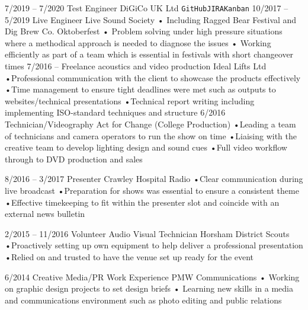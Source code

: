 \documentclass[9pt]{developercv} %
\begin{document}
\begin{entrylist}
	\entry
		{7/2019 -- 7/2020}
		{Test Engineer}
		{DiGiCo UK Ltd}
		{\texttt{GitHub}\slashsep\texttt{JIRA}\slashsep\texttt{Kanban}}
		\entry
		{10/2017 -- 5/2019}
		{Live Engineer}
		{Live Sound Society}
		{• Including Ragged Bear Festival and Dig Brew Co. Oktoberfest \newline• Problem solving under high pressure situations where a methodical approach is needed to diagnose the issues
\newline• Working efficiently as part of a team which is essential in festivals with short changeover times}
\entry
		{7/2016 -- }
		{Freelance acoustics and video production}
		{Ideal Lifts Ltd}
		{•Professional communication with the client to showcase the products effectively
\newline•Time management to ensure tight deadlines were met such as outputs to websites/technical presentations
\newline•Technical report writing including implementing ISO-standard techniques and structure}
\entry
		{6/2016}
		{Technician/Videography}
		{Act for Change  (College Production)}
		{•Leading a team of technicians and camera operators to run the show on time
\newline•Liaising with the creative team to develop lighting design and sound cues
\newline•Full video workflow through to DVD production and sales}

\entry
		{8/2016 -- 3/2017}
		{Presenter}
		{Crawley Hospital Radio}
		{•Clear communication during live broadcast
\newline•Preparation for shows was essential to ensure a consistent theme
\newline•Effective timekeeping to fit within the presenter slot and coincide with an external news bulletin}

\entry
		{2/2015 -- 11/2016}
		{Volunteer Audio Visual Technician}
		{Horsham District Scouts}
		{•Proactively setting up own equipment to help deliver a professional presentation
\newline•Relied on and trusted to have the venue set up ready for the event}

\entry
		{6/2014}
		{Creative Media/PR Work Experience}
		{PMW Communications}
		{• Working on graphic design projects to set design briefs
\newline• Learning new skills in a media and communications environment such as photo editing and public relations}


\end{entrylist}
\end{document}

